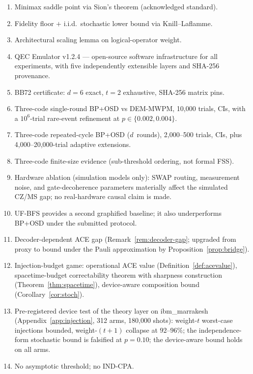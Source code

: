 \documentclass[11pt,a4paper]{article}
\begin{document}
\begin{enumerate}[leftmargin=1.6em,label=(\roman*)]
  \item Minimax saddle point via Sion's theorem (acknowledged standard).
  \item Fidelity floor $+$ i.i.d.\ stochastic lower bound via Knill--Laflamme.
  \item Architectural scaling lemma on logical-operator weight.
  \item QEC Emulator v1.2.4 --- open-source software infrastructure for all
    experiments, with five independently extensible layers and SHA-256 provenance.
  \item BB72 certificate: $d=6$ exact, $t=2$ exhaustive, SHA-256 matrix pins.
  \item Three-code single-round BP+OSD vs DEM-MWPM, 10{,}000 trials, CIs,
    with a $10^{6}$-trial rare-event refinement at $p\in\{0.002,0.004\}$.
  \item Three-code repeated-cycle BP+OSD ($d$~rounds), 2{,}000--500 trials, CIs,
    plus 4{,}000--20{,}000-trial adaptive extensions.
  \item Three-code finite-size evidence (sub-threshold ordering, not formal FSS).
  \item Hardware ablation (simulation models only): SWAP routing, measurement noise, and gate-decoherence parameters materially affect the simulated CZ/MS gap; no real-hardware causal claim is made.
  \item UF-BFS provides a second graphified baseline; it also underperforms BP+OSD under the submitted protocol.
  \item Decoder-dependent ACE gap (Remark~\ref{rem:decoder-gap}; upgraded from
    proxy to bound under the Pauli approximation by
    Proposition~\ref{prop:bridge}).
  \item Injection-budget game: operational ACE value
    (Definition~\ref{def:acevalue}), spacetime-budget correctability theorem
    with sharpness construction (Theorem~\ref{thm:spacetime}), device-aware
    composition bound (Corollary~\ref{cor:stoch}).
  \item Pre-registered device test of the theory layer on ibm\_marrakesh
    (Appendix~\ref{app:injection}, 312 arms, 180{,}000 shots): weight-$t$
    worst-case injections bounded, weight-$(t{+}1)$ collapse at
    $92$--$96\%$; the independence-form stochastic bound is falsified at
    $p=0.10$; the device-aware bound holds on all arms.
  \item No asymptotic threshold; no IND-CPA.
\end{enumerate}
\end{document}
